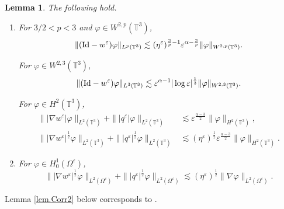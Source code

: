 \documentclass[11pt,a4paper]{article}
\numberwithin{equation}{section}
\newtheorem{lemma}[theorem]{Lemma}
\newcommand{\T}{\mathbb{T}}
\newcommand{\eps}{\varepsilon}
\begin{document}
\begin{lemma}\label{lem.Corr1}
The following hold. 
\begin{enumerate}[(1)]
\item\label{item1.lem.Corr1}
For $3/2<p<3$ and $\varphi\in W^{2,p}(\T^3)$,
\begin{equation} \label{ESTI1}
    \|({\rm Id} - w^\eps)\varphi\|_{L^p(\T^3)} 
    \lesssim
    (\eta^\eps)^{\frac{3}{p}-1} \eps^{\alpha-\frac{3}{p}}
    \|\varphi\|_{W^{2,p}(\T^3)}.
\end{equation}


For $\varphi\in W^{2,3}(\T^3)$,
\begin{equation} \label{ESTI2}
    \|({\rm Id} - w^\eps)\varphi\|_{L^3(\T^3)} 
    \lesssim
    \eps^{\alpha-1} |\log \eps|^\frac13
    \|\varphi\|_{W^{2,3}(\T^3)}.
\end{equation}


For $\varphi\in H^{2}(\T^3)$,
\begin{align}
    \||\nabla w^\eps| \varphi\|_{L^2(\T^3)} 
    + \||q^\eps| \varphi\|_{L^2(\T^3)}
    &\lesssim
    \eps^{\frac{\alpha-3}{2}}
    \|\varphi\|_{H^2(\T^3)},\\
    \||\nabla w^\eps|^{\frac12} \varphi\|_{L^2(\T^3)} 
    + \||q^\eps|^{\frac12} \varphi\|_{L^2(\T^3)}
    &\lesssim
    (\eta^\eps)^{\frac12}
    \eps^{\frac{\alpha-3}{2}}
    \|\varphi\|_{H^2(\T^3)}.
\end{align}


\item\label{item2.lem.Corr1}
For $\varphi\in H^1_0(\Omega^{\eps})$,
\begin{equation}
    \||\nabla w^\eps|^{\frac12} \varphi\|_{L^2(\Omega^{\eps})} 
    + \||q^\eps|^{\frac12} \varphi\|_{L^2(\Omega^{\eps})}
    \lesssim
    (\eta^\eps)^{\frac12}
    \|\nabla\varphi\|_{L^2(\Omega^{\eps})}.
\end{equation}
\end{enumerate}
\end{lemma}


Lemma \ref{lem.Corr2} below corresponds to \cite[Lemma 2.2]{Hof23}. 
\end{document}
